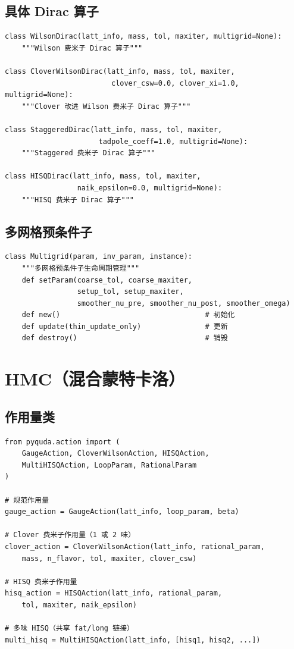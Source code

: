\documentclass[12pt,a4paper]{ctexart}
\begin{document}
\subsection{具体 Dirac 算子}

\begin{lstlisting}[style=pycode]
class WilsonDirac(latt_info, mass, tol, maxiter, multigrid=None):
    """Wilson 费米子 Dirac 算子"""

class CloverWilsonDirac(latt_info, mass, tol, maxiter,
                         clover_csw=0.0, clover_xi=1.0, multigrid=None):
    """Clover 改进 Wilson 费米子 Dirac 算子"""

class StaggeredDirac(latt_info, mass, tol, maxiter,
                      tadpole_coeff=1.0, multigrid=None):
    """Staggered 费米子 Dirac 算子"""

class HISQDirac(latt_info, mass, tol, maxiter,
                 naik_epsilon=0.0, multigrid=None):
    """HISQ 费米子 Dirac 算子"""
\end{lstlisting}

\subsection{多网格预条件子}

\begin{lstlisting}[style=pycode]
class Multigrid(param, inv_param, instance):
    """多网格预条件子生命周期管理"""
    def setParam(coarse_tol, coarse_maxiter,
                 setup_tol, setup_maxiter,
                 smoother_nu_pre, smoother_nu_post, smoother_omega)
    def new()                                  # 初始化
    def update(thin_update_only)               # 更新
    def destroy()                              # 销毁
\end{lstlisting}

\section{HMC（混合蒙特卡洛）}

\subsection{作用量类}

\begin{lstlisting}[style=pycode]
from pyquda.action import (
    GaugeAction, CloverWilsonAction, HISQAction,
    MultiHISQAction, LoopParam, RationalParam
)

# 规范作用量
gauge_action = GaugeAction(latt_info, loop_param, beta)

# Clover 费米子作用量（1 或 2 味）
clover_action = CloverWilsonAction(latt_info, rational_param,
    mass, n_flavor, tol, maxiter, clover_csw)

# HISQ 费米子作用量
hisq_action = HISQAction(latt_info, rational_param,
    tol, maxiter, naik_epsilon)

# 多味 HISQ（共享 fat/long 链接）
multi_hisq = MultiHISQAction(latt_info, [hisq1, hisq2, ...])
\end{lstlisting}
\end{document}
